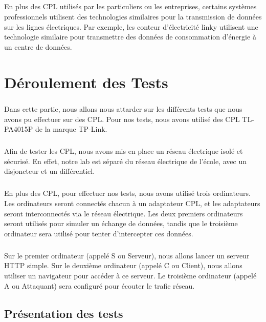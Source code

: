 \documentclass[a4paper,twocolumn]{report}
\begin{document}
\paragraph{}En plus des CPL utilisés par les particuliers ou les entreprises, certains systèmes professionnels utilisent des technologies similaires pour la transmission de données sur les lignes électriques. Par exemple, les conteur d'électricité linky utilisent une technologie similaire pour transmettre des données de consommation d'énergie à un centre de données.


\chapter{Déroulement des Tests}
\paragraph{}Dans cette partie, nous allons nous attarder sur les différents tests
que nous avons pu effectuer sur des CPL. Pour nos tests, nous avons utilisé des CPL TL-PA4015P de la marque TP-Link.
\paragraph{}Afin de tester les CPL, nous avons mis en place un réseau électrique
isolé et sécurisé. En effet, notre lab est séparé du réseau électrique de l'école,
avec un disjoncteur et un différentiel.
\paragraph{}En plus des CPL, pour effectuer nos tests, nous avons utilisé trois ordinateurs.
Les ordinateurs seront connectés chacun à un adaptateur CPL, et les adaptateurs
seront interconnectés via le réseau électrique. Les deux premiers ordinateurs seront utilisés
pour simuler un échange de données, tandis que le troisième ordinateur sera utilisé pour tenter
d'intercepter ces données.
\paragraph{}Sur le premier ordinateur (appelé S ou Serveur), nous allons lancer un serveur HTTP simple.
Sur le deuxième ordinateur (appelé C ou Client), nous allons utiliser un navigateur pour accéder à ce serveur.
Le troisième ordinateur (appelé A ou Attaquant) sera configuré pour écouter le trafic réseau.


\section{Présentation des tests}
\end{document}
